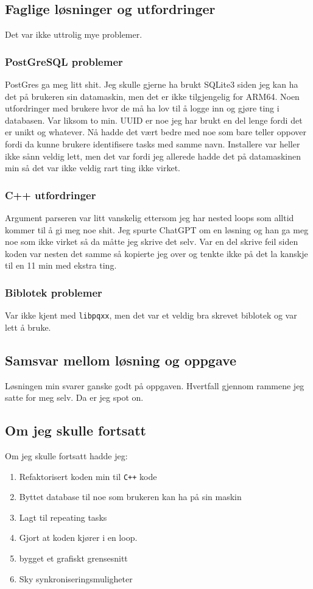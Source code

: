\documentclass{article}
\begin{document}
\subsection{Faglige løsninger og utfordringer}
Det var ikke uttrolig mye problemer.
\subsubsection{PostGreSQL problemer}
PostGres ga meg litt shit. Jeg skulle gjerne ha brukt SQLite3 siden jeg kan ha det på brukeren sin datamaskin, men det er ikke tilgjengelig for ARM64. Noen utfordringer med brukere hvor de må ha lov til å logge inn og gjøre ting i databasen. Var liksom to min.
UUID er noe jeg har brukt en del lenge fordi det er unikt og whatever. Nå hadde det vært bedre med noe som bare teller oppover fordi da kunne brukere identifisere tasks med samme navn.
Installere var heller ikke sånn veldig lett, men det var fordi jeg allerede hadde det på datamaskinen min så det var ikke veldig rart ting ikke virket.

\subsubsection{C++ utfordringer}
Argument parseren var litt vanskelig ettersom jeg har nested loops som alltid kommer til å gi meg noe shit. Jeg spurte ChatGPT om en løsning og han ga meg noe som ikke virket så da måtte jeg skrive det selv. Var en del skrive feil siden koden var nesten det samme så kopierte jeg over og tenkte ikke på det la kanskje til en 11 min med ekstra ting.
\subsubsection{Biblotek problemer}
Var ikke kjent med \lstinline{libpqxx}, men det var et veldig bra skrevet biblotek og var lett å bruke.
\subsection{Samsvar mellom løsning og oppgave}
Løsningen min svarer ganske godt på oppgaven. Hvertfall gjennom rammene jeg satte for meg selv. Da er jeg spot on.
\subsection{Om jeg skulle fortsatt}
Om jeg skulle fortsatt hadde jeg:
\begin{enumerate}
    \item Refaktorisert koden min til \lstinline{C++} kode
    \item Byttet database til noe som brukeren kan ha på sin maskin
    \item Lagt til repeating tasks
    \item Gjort at koden kjører i en loop.
    \item bygget et grafiskt grensesnitt
    \item Sky synkroniseringsmuligheter
\end{enumerate}
\end{document}
